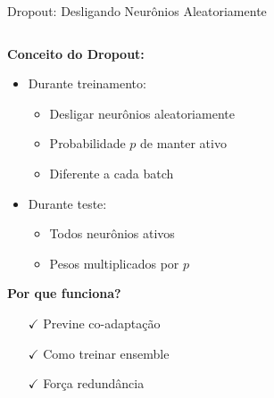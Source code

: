 \documentclass[xcolor=dvipsnames,t,aspectratio=169]{beamer}
\newcommand{\highlight}[1]{{\color{nes_dark_orange} #1}}
\begin{document}
\begin{frame}[c]{Dropout: Desligando Neurônios Aleatoriamente}
    \begin{columns}[c]
        \begin{column}{0.55\textwidth}
            \textbf{Conceito do Dropout:}
            \begin{itemize}
                \item Durante \highlight{treinamento}:
                \begin{itemize}
                    \item Desligar neurônios aleatoriamente
                    \item Probabilidade $p$ de manter ativo
                    \item Diferente a cada batch
                \end{itemize}
                \item Durante \highlight{teste}:
                \begin{itemize}
                    \item Todos neurônios ativos
                    \item Pesos multiplicados por $p$
                \end{itemize}
            \end{itemize}
            
            \vspace{0.5cm}
            \textbf{Por que funciona?}
            \begin{itemize}
                \item[$\checkmark$] Previne co-adaptação
                \item[$\checkmark$] Como treinar ensemble
                \item[$\checkmark$] Força redundância
            \end{itemize}
        \end{column}
        \begin{column}{0.45\textwidth}
\end{column}
\end{columns}
\end{frame}
\end{document}

